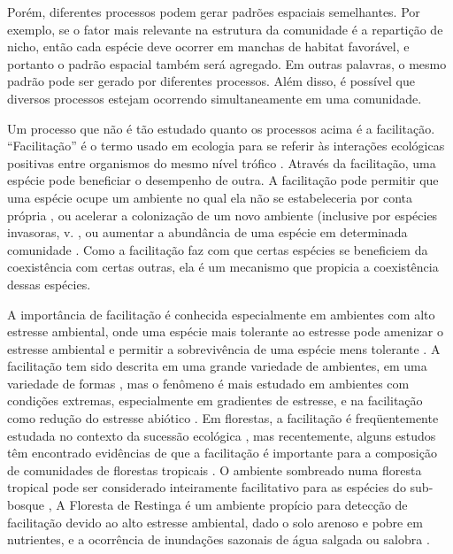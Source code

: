 \documentclass[twoside,12pt,a4paper]{report}
\begin{document}
Porém, diferentes processos podem gerar padrões espaciais semelhantes. Por exemplo, se o
fator mais relevante na estrutura da comunidade é a repartição de nicho, então cada espécie
deve ocorrer em manchas de habitat favorável, e portanto o padrão espacial também será
agregado. Em outras palavras, o mesmo padrão pode ser gerado por diferentes processos. Além
disso, é possível que diversos processos estejam ocorrendo simultaneamente em uma comunidade.

Um processo que não é tão estudado quanto os processos acima é a facilitação.
“Facilitação” é o termo usado em ecologia para se referir às interações ecológicas positivas entre
organismos do mesmo nível trófico \citep{Pakeman2009}. 
Através da facilitação, uma espécie pode beneficiar o desempenho de outra. 
A facilitação pode permitir que uma
espécie ocupe um ambiente no qual ela não se estabeleceria por conta própria \citep{Lortie2004},
ou acelerar a colonização de um novo ambiente (inclusive por espécies invasoras, v.
\citep{Wundrow2012}, ou aumentar a abundância de uma espécie em determinada comunidade \citep{Alados2006; CallawayBook}.
Como a facilitação faz com que certas espécies se beneficiem da coexistência com certas
outras, ela é um mecanismo que propicia a coexistência dessas espécies.

A importância de facilitação é conhecida especialmente em ambientes com alto estresse
ambiental, onde uma espécie mais tolerante ao estresse pode amenizar o estresse ambiental e
permitir a sobrevivência de uma espécie mens tolerante \citep{BertnessHacker1994,
CallawayHacker1995}. 
A facilitação tem sido descrita em uma grande variedade de ambientes, em
uma variedade de formas \citep{McIntire2014}, mas o fenômeno é mais estudado em ambientes com
condições extremas, especialmente em gradientes de estresse, e na facilitação como redução do
estresse abiótico \citep{Brooker2008}. Em florestas, a facilitação é freqüentemente
estudada no contexto da sucessão ecológica \citep{refs refs refs}, mas recentemente, alguns
estudos têm encontrado evidências de que a facilitação é importante para a composição de
comunidades de florestas tropicais
\citep{Ledo2015,refs}. O ambiente sombreado numa
floresta tropical pode ser considerado inteiramente facilitativo para as espécies do sub-bosque
\citep{McIntire2014}, 
A Floresta de Restinga é um ambiente propício para detecção de facilitação devido ao alto estresse
ambiental, dado o solo arenoso e pobre em nutrientes, e a ocorrência de inundações sazonais de água
salgada ou salobra \citep{TODO refs}. 
\end{document}
